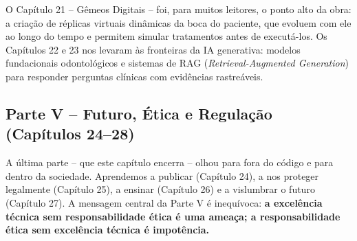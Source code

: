 O Capítulo 21 -- Gêmeos Digitais -- foi, para muitos leitores, o ponto alto
da obra: a criação de réplicas virtuais dinâmicas da boca do paciente, que
evoluem com ele ao longo do tempo e permitem simular tratamentos antes de
executá-los. Os Capítulos 22 e 23 nos levaram às fronteiras da IA generativa:
modelos fundacionais odontológicos e sistemas de RAG (\textit{Retrieval-Augmented
Generation}) para responder perguntas clínicas com evidências rastreáveis.

\subsection{Parte V -- Futuro, Ética e Regulação (Capítulos 24--28)}

A última parte -- que este capítulo encerra -- olhou para fora do código e para
dentro da sociedade. Aprendemos a publicar (Capítulo 24), a nos proteger
legalmente (Capítulo 25), a ensinar (Capítulo 26) e a vislumbrar o futuro
(Capítulo 27). A mensagem central da Parte V é inequívoca: \textbf{a excelência
técnica sem responsabilidade ética é uma ameaça; a responsabilidade ética sem
excelência técnica é impotência.}


